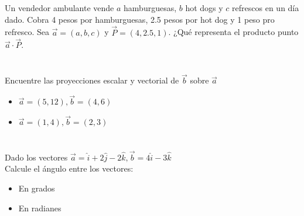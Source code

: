 \documentclass[12pt]{article}
\begin{document}
\section{}

Un vendedor ambulante vende $a$ hamburguesas, $b$ hot dogs y $c$ refrescos en un día dado. Cobra 4 pesos por hamburguesas, 2.5 pesos por hot dog y 1 peso pro refresco. Sea $\vec{a}=(a,b,c)$ y $\vec{P}=(4,2.5,1)$. ¿Qué representa el producto punto $\vec{a} \cdot \vec{P}$.

\section{}

Encuentre las proyecciones escalar y vectorial de $\vec{b}$ sobre $\vec{a}$

\begin{itemize}
  
\item $\vec{a}= (5,12), \vec{b}=(4,6)$
  
\item $\vec{a}= (1,4), \vec{b}=(2,3)$
  
\end{itemize}

\section{}

Dado los vectores $\vec{a} = \hat{i} + 2\hat{j}-2\hat{k}, \vec{b} = 4\hat{i} -3\hat{k}$ \\
Calcule el ángulo entre los vectores:

\begin{itemize}

\item En grados

\item En radianes

\end{itemize}

\section{}
\end{document}
